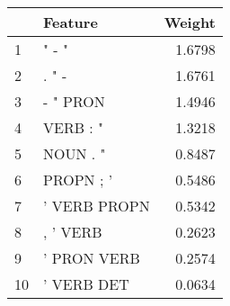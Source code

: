 \begin{tabular}{llr}
\toprule
{} &       Feature &  Weight \\
\midrule
1  &         " - " &  1.6798 \\
2  &         . " - &  1.6761 \\
3  &      - " PRON &  1.4946 \\
4  &      VERB : " &  1.3218 \\
5  &      NOUN . " &  0.8487 \\
6  &     PROPN ; ' &  0.5486 \\
7  &  ' VERB PROPN &  0.5342 \\
8  &      , ' VERB &  0.2623 \\
9  &   ' PRON VERB &  0.2574 \\
10 &    ' VERB DET &  0.0634 \\
\bottomrule
\end{tabular}
